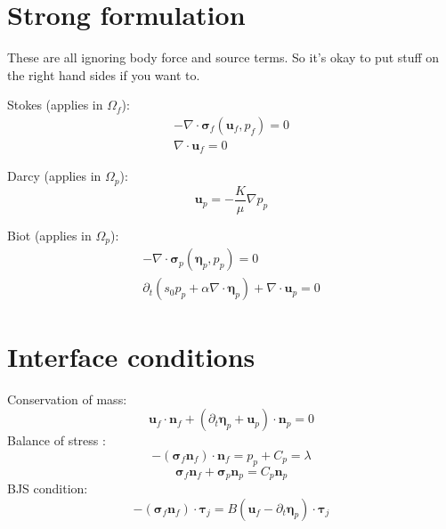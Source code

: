 \documentclass{article}
\newcommand{\mathspace}[1]{\ensuremath{#1}\xspace} %
\newcommand{\sigmabf}{\mathspace{\boldsymbol{\sigma}}}
\newcommand{\grad}{\mathspace{\nabla}}
\renewcommand{\div}{\mathspace{\nabla \cdot}}
\newcommand{\ddt}[1]{\mathspace{\partial_t #1}}
\newcommand{\taubf}{\mathspace{\boldsymbol{\tau}}}
\newcommand{\stokes}{\mathspace{\Omega_{f}}}
\newcommand{\darcy}{\mathspace{\Omega_{p}}}
\newcommand{\nf}{\mathspace{\mathbf{n}_f}}
\newcommand{\np}{\mathspace{\mathbf{n}_p}}
\newcommand{\uf}{\mathspace{\mathbf{u}_f}}
\newcommand{\up}{\mathspace{\mathbf{u}_p}}
\newcommand{\pf}{\mathspace{p_f}}
\newcommand{\pp}{\mathspace{p_p}}
\newcommand{\disp}{\mathspace{\boldsymbol{\eta}_p}}
\begin{document}
\section{Strong formulation}
These are all ignoring body force and source terms. So it's okay to put stuff on the right hand sides if you want to.

Stokes (applies in \stokes):
\begin{subequations}
  \begin{align}
    - \div \sigmabf_f (\uf, \pf) = 0    \label{eq:stokes_stress} \\
    \div \uf = 0    \label{eq:stokes_conservation}
  \end{align}
\end{subequations}

Darcy (applies in \darcy):
\begin{equation}
    \up = - \frac {K} {\mu} \grad \pp     \label{eq:darcy}
  \end{equation}

  
Biot (applies in \darcy):
\begin{subequations}
  \begin{align}
    - \div \sigmabf_p (\disp, \pp) = 0     \label{eq:biot_stress} \\
    \ddt{} \left ( s_0 \pp + \alpha \div \disp \right ) + \div \up = 0    \label{eq:biot_conservation}
  \end{align}
\end{subequations}
\section{Interface conditions}

Conservation of mass:
\begin{equation}
\uf  \cdot \nf + \left ( \ddt{\disp} + \up \right ) \cdot \np = 0  \label{eq:massconservation}
\end{equation}
Balance of stress :
\begin{equation}
  -(\sigmabf_f \nf) \cdot \nf = \pp + C_p = \lambda  \label{eq:stressbalance1_mult}
\end{equation}
\begin{equation}
  \sigmabf_f \nf + \sigmabf_p \np = C_p \np \label{eq:stressbalance2}
\end{equation}
BJS condition:
\begin{equation}
  -(\sigmabf_f \nf) \cdot \taubf_j = B \left ( \uf - \ddt{\disp} \right ) \cdot \taubf_j
  \label{eq:BJS}
\end{equation}
\end{document}
